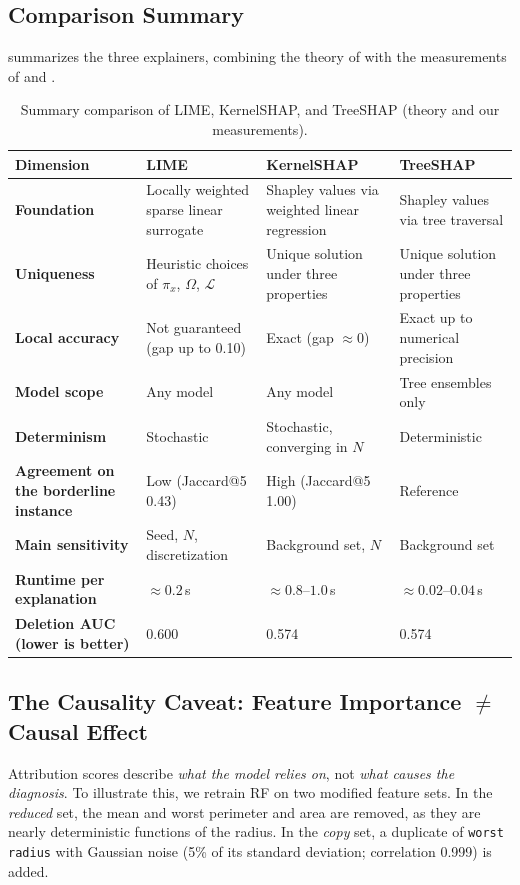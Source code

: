 \subsection{Comparison Summary}
\label{sec:comparison-table}

 summarizes the three explainers, combining the theory of  with the measurements of  and .

\begin{table}[t]
    \centering
    \caption{Summary comparison of LIME, KernelSHAP, and TreeSHAP (theory and our measurements).}
    \label{tab:lime-vs-shap}
    \footnotesize
    \renewcommand{\arraystretch}{1.15}
    \begin{tabularx}{\textwidth}{@{}>{\bfseries}p{} X X X@{}}
        \toprule
        Dimension & LIME & KernelSHAP & TreeSHAP \\
        \midrule
        Foundation & Locally weighted sparse linear surrogate & Shapley values via weighted linear regression & Shapley values via tree traversal \\
        Uniqueness & Heuristic choices of $\pi_x$, $\Omega$, $\mathcal{L}$ & Unique solution under three properties & Unique solution under three properties \\
        Local accuracy & Not guaranteed (gap up to 0.10) & Exact (gap $\approx 0$) & Exact up to numerical precision \\
        Model scope & Any model & Any model & Tree ensembles only \\
        Determinism & Stochastic & Stochastic, converging in $N$ & Deterministic \\
        Agreement on the borderline instance & Low (Jaccard@5 0.43) & High (Jaccard@5 1.00) & Reference \\
        Main sensitivity & Seed, $N$, discretization & Background set, $N$ & Background set \\
        Runtime per explanation & $\approx 0.2$\,s & $\approx 0.8$--$1.0$\,s & $\approx 0.02$--$0.04$\,s \\
        Deletion AUC (lower is better) & 0.600 & 0.574 & 0.574 \\
        \bottomrule
    \end{tabularx}
\end{table}

\subsection{The Causality Caveat: \texorpdfstring{Feature Importance $\neq$ Causal Effect}{Feature Importance is not Causal Effect}}
Attribution scores describe \textit{what the model relies on}, not \textit{what causes the diagnosis}. To illustrate this, we retrain RF on two modified feature sets. In the \textit{reduced} set, the mean and worst perimeter and area are removed, as they are nearly deterministic functions of the radius. In the \textit{copy} set, a duplicate of \texttt{worst radius} with Gaussian noise (5\% of its standard deviation; correlation 0.999) is added.

